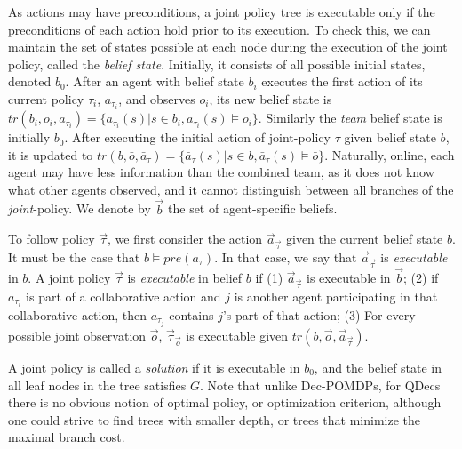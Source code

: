 \documentclass[letterpaper]{article} %
\theoremstyle{definition}
\begin{document}
As actions may have preconditions, a joint policy tree is executable only if the preconditions of each action hold prior to its execution. To check this, we can maintain the set of states possible at each node during the execution of the joint policy, called the
\emph{belief state}. Initially, it consists of all possible initial states, denoted $b_0$.
After an agent with belief state $b_i$ executes the first action of its current policy $\tau_i$, $a_{\tau_i}$, and observes ${o_i}$, its new belief state is
$tr(b_i,o_i,{a}_{\tau_i}) = \{a_{\tau_i}(s) | s\in b_i, a_{\tau_i}(s)\models o_i\}$.
Similarly the {\em team} belief state is
initially $b_0$. After executing the initial action of joint-policy $\tau$ given belief state $b$, it is updated to
$tr(b,\bar{o},\bar{a}_{\tau}) = \{\bar{a}_{\tau}(s) | s\in b, \bar{a}_{\tau}(s)\models \bar{o}\}$.
Naturally,
online, each agent may have less information than the combined team, as it does not know what other agents observed, and it cannot distinguish between all branches of the {\em joint}-policy. We denote by $\vec{b}$ the set of agent-specific beliefs.

To follow policy $\vec{\tau}$, we first consider the action $\vec{a}_{\vec{\tau}}$ given the current belief state $b$. It must be the case that
$b \models pre(a_{\tau})$. In that case, we say that  $\vec{a}_{\vec{\tau}}$ is {\em executable} in $b$.
%
A  joint policy  $\vec{\tau}$ is {\em executable} in belief  $b$ if (1) $\vec{a}_{\vec{\tau}}$ is executable in $\vec{b}$;  (2) if $a_{\tau_i}$ is  part of a collaborative action and $j$ is another agent participating in that collaborative action, then $a_{\tau_j}$ contains $j$'s part of that action;
(3) For every possible joint observation $\vec{o}$,    $\vec{\tau}_{\vec{o}}$ is executable given $tr(b,\vec{o},\vec{a}_{\vec{\tau}})$.

A joint policy is called a {\em solution} if it is executable in $b_0$, and the belief state in all leaf nodes in the tree satisfies $G$.
Note that unlike Dec-POMDPs, for QDecs there is no obvious notion of optimal policy, or optimization criterion, although one could strive to find trees with smaller depth, or trees that minimize the maximal branch cost.
\end{document}
